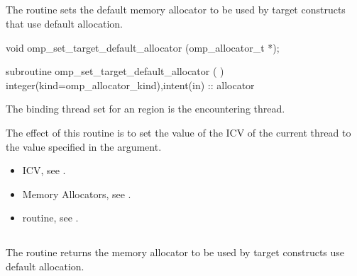 \ccppspecificstart

\subsection{}
\label{subsec:omp_set_target_default_allocator}

\summary
The  routine sets the default memory allocator to be used by target constructs that use default allocation.

\format
\ccppspecificstart
\begin{boxedcode}
void omp_set_target_default_allocator (omp_allocator_t *);
\end{boxedcode}
\ccppspecificend
\fortranspecificstart
\begin{boxedcode}
subroutine omp_set_target_default_allocator (  )
integer(kind=omp_allocator_kind),intent(in) :: allocator
\end{boxedcode}
\fortranspecificend
\binding
The binding thread set for an  region is the encountering thread.

\effect

The effect of this routine is to set the value of the  ICV of the current thread to the value specified in the  argument. 

\crossreferences

\begin{itemize}
\item {} ICV, see .
\item Memory Allocators, see .
\item {} routine, see .
\end{itemize}

\subsection{}
\label{subsec:omp_get_target_default_allocator}

\summary
The  routine returns the memory allocator to be used by target constructs use default allocation.

